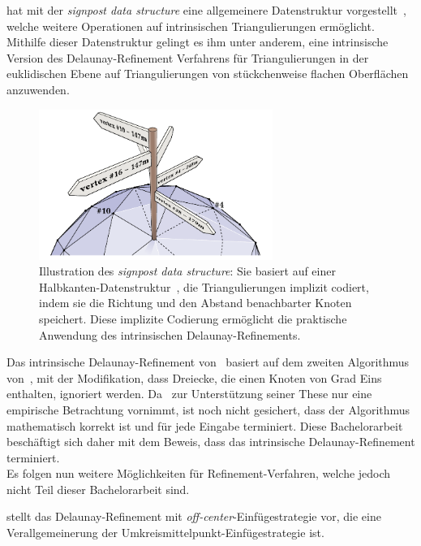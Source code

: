 \citet{Sharp:2019:NIT} hat mit der \textit{signpost data structure} eine allgemeinere Datenstruktur vorgestellt~\cite[Abschnitt 3]{Sharp:2019:NIT}, welche weitere Operationen auf intrinsischen Triangulierungen ermöglicht. Mithilfe dieser Datenstruktur gelingt es ihm unter anderem, eine intrinsische Version des Delaunay-Refinement Verfahrens für Triangulierungen in der euklidischen Ebene auf Triangulierungen von stückchenweise flachen Oberflächen~\cite[Definition 1]{Bobenko:2007:LaplaceBeltrami} anzuwenden. 
 \begin{figure}[ht]%
    \centering
  \includegraphics[width=3in]{images/signpostDataStructure.png}
  
  \caption{Illustration des \textit{signpost data structure}: Sie basiert auf einer Halbkanten-Datenstruktur~\cite{mantyla:1987:halfedge}, die  Triangulierungen implizit codiert, indem sie die Richtung und den Abstand benachbarter Knoten speichert. Diese implizite Codierung ermöglicht die praktische Anwendung des intrinsischen Delaunay-Refinements.  \cite{Bobenko:2006:SIGGRAPH}}
\end{figure}
Das intrinsische Delaunay-Refinement von~\citeauthor{Sharp:2019:NIT} basiert auf dem zweiten Algorithmus von~\citet{chew:1993:guaranteed}, mit der Modifikation, dass Dreiecke, die einen Knoten von Grad Eins enthalten, ignoriert werden. 
Da~\citet{Sharp:2019:NIT} zur Unterstützung seiner These nur eine empirische Betrachtung vornimmt, ist noch nicht gesichert, dass der Algorithmus mathematisch korrekt ist und für jede Eingabe terminiert. Diese Bachelorarbeit beschäftigt sich daher mit dem Beweis, dass das intrinsische Delaunay-Refinement terminiert.\\

Es folgen nun weitere Möglichkeiten für Refinement-Verfahren, welche jedoch nicht Teil dieser Bachelorarbeit sind.

\citet{ungoe:2004:off-center} stellt das Delaunay-Refinement mit \textit{off-center}-Einfügestrategie vor, die eine Verallgemeinerung der Umkreismittelpunkt-Einfügestrategie ist.

